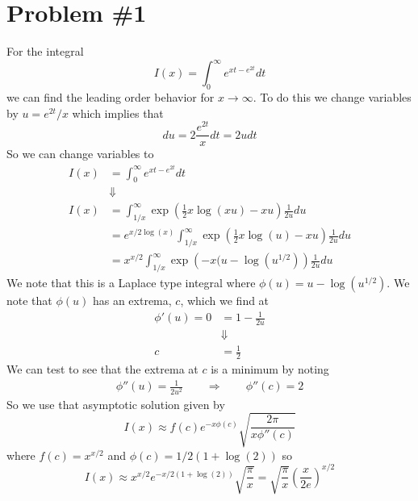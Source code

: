\documentclass[11pt]{article}
\numberwithin{equation}{section}
\begin{document}


\section{Problem \#1}
For the integral
$$I(x) = \int_{0}^{\infty}e^{xt-e^{2t}}dt$$
we can find the leading order behavior for $x\rightarrow\infty$. To do this we change 
variables by $u = e^{2t}/x$ which implies that 
$$du = 2\frac{e^{2t}}{x}dt = 2udt$$
So we can change variables to
\begin{align*}
I(x) &= \int_{0}^{\infty}e^{xt-e^{2t}}dt\\
&\Downarrow\\
I(x) &= \int_{1/x}^{\infty}\exp\left(\frac{1}{2}x\log(xu)-xu\right)\frac{1}{2u}du\\
&= e^{x/2\log(x)}\int_{1/x}^{\infty}\exp\left(\frac{1}{2}x\log(u)-xu\right)\frac{1}{2u}du\\
&= x^{x/2}\int_{1/x}^{\infty}\exp\left(-x(u-\log(u^{1/2})\right)\frac{1}{2u}du
\end{align*}
We note that this is a Laplace type integral where $\phi(u) = u - \log(u^{1/2})$. We note 
that $\phi(u)$ has an extrema, $c$, which we find at
\begin{align*}
\phi'(u) = 0 &= 1 - \frac{1}{2u}\\
&\Downarrow\\
c &= \frac{1}{2}
\end{align*}
We can test to see that the extrema at $c$ is a minimum by noting 
\begin{align*}
\phi''(u) = \frac{1}{2u^2} \qquad \Rightarrow \qquad \phi''(c) = 2
\end{align*}
So we use that asymptotic solution given by
$$I(x) \approx f(c)e^{-x\phi(c)}\sqrt{\frac{2\pi}{x\phi''(c)}}$$
where $f(c) = x^{x/2}$ and $\phi(c) = 1/2(1+\log(2))$ so
$$I(x) \approx x^{x/2}e^{-x/2(1+\log(2))}\sqrt{\frac{\pi}{x}} = \sqrt{\frac{\pi}{x}}\left(\frac{x}{2e}\right)^{x/2}$$

\pagebreak
\end{document}
